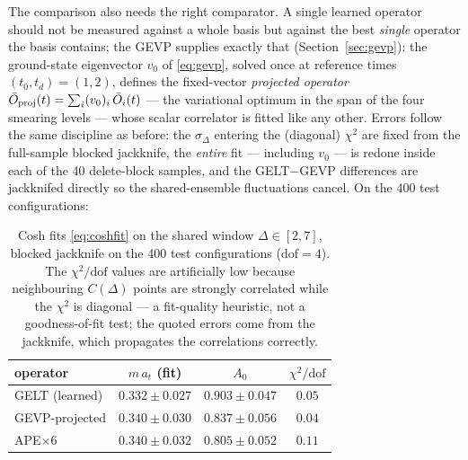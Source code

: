 \documentclass[11pt,a4paper]{article}
\newcommand{\Obar}{\bar{O}}
\newcommand{\at}{a_t}
\begin{document}
The comparison also needs the right comparator. A single learned operator
should not be measured against a whole basis but against the best
\emph{single} operator the basis contains; the GEVP supplies exactly that
(Section~\ref{sec:gevp}): the ground-state eigenvector $v_0$ of
\eqref{eq:gevp}, solved once at reference times $(t_0,t_d)=(1,2)$, defines
the fixed-vector \emph{projected operator}
$\Obar_{\rm proj}(t)=\sum_i (v_0)_i\,\Obar_i(t)$ --- the variational optimum
in the span of the four smearing levels \cite{Blossier2009} --- whose scalar
correlator is fitted like any other. Errors follow the same discipline as
before: the $\sigma_\Delta$ entering the (diagonal) $\chi^2$ are fixed from
the full-sample blocked jackknife, the \emph{entire} fit --- including
$v_0$ --- is redone inside each of the 40 delete-block samples, and the
GELT$-$GEVP differences are jackknifed directly so the shared-ensemble
fluctuations cancel. On the 400 test configurations:

\begin{table}[htbp]
  \centering
  \begin{tabular}{lccc}
    \toprule
    operator & $m\,\at$ (fit) & $A_0$ & $\chi^2/\mathrm{dof}$ \\
    \midrule
    GELT (learned)    & $0.332\pm0.027$ & $\mathbf{0.903\pm0.047}$ & $0.05$ \\
    GEVP-projected    & $0.340\pm0.030$ & $0.837\pm0.056$          & $0.04$ \\
    APE$\times6$      & $0.340\pm0.032$ & $0.805\pm0.052$          & $0.11$ \\
    \bottomrule
  \end{tabular}
  \caption{Cosh fits \eqref{eq:coshfit} on the shared window
  $\Delta\in[2,7]$, blocked jackknife on the 400 test configurations
  ($\mathrm{dof}=4$). The $\chi^2/\mathrm{dof}$ values are artificially low
  because neighbouring $C(\Delta)$ points are strongly correlated while the
  $\chi^2$ is diagonal --- a fit-quality heuristic, not a goodness-of-fit
  test; the quoted errors come from the jackknife, which propagates the
  correlations correctly.}
  \label{tab:overlap}
\end{table}
\end{document}
